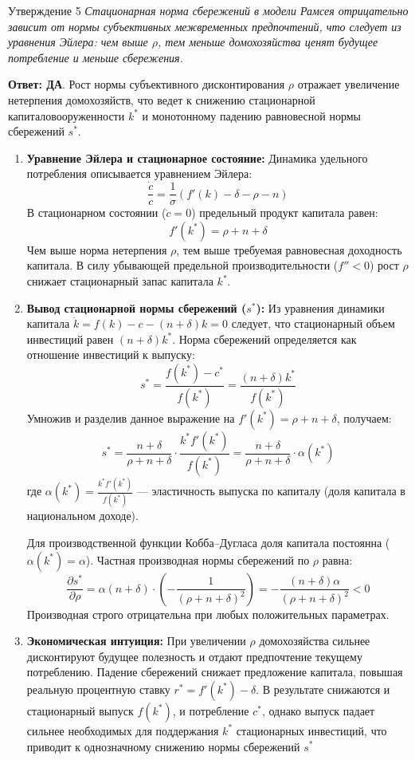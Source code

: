\documentclass[10pt,a4paper]{article}
\newcommand{\qda}{\textbf{\color{yesgreen}Ответ: ДА}}
\newenvironment{answer}[2]{%
  \begin{qbox}{Утверждение #1}
  \textit{#2}\par\smallskip
}{%
  \end{qbox}\vspace{2pt}
}
\begin{document}
\begin{answer}{5}{Стационарная норма сбережений в модели Рамсея отрицательно зависит от нормы субъективных межвременных предпочтений, что следует из уравнения Эйлера: чем выше $\rho$, тем меньше домохозяйства ценят будущее потребление и меньше сбережения.}
\qda. Рост нормы субъективного дисконтирования $\rho$ отражает увеличение нетерпения домохозяйств, что ведет к снижению стационарной капиталовооруженности $k^*$ и монотонному падению равновесной нормы сбережений $s^*$.

\begin{enumerate}
    \item \textbf{Уравнение Эйлера и стационарное состояние:}
    Динамика удельного потребления описывается уравнением Эйлера:
    \[
    \frac{\dot{c}}{c} = \frac{1}{\sigma} \left( f'(k) - \delta - \rho - n \right)
    \]
    В стационарном состоянии ($\dot{c} = 0$) предельный продукт капитала равен:
    \[
    f'(k^*) = \rho + n + \delta
    \]
    Чем выше норма нетерпения $\rho$, тем выше требуемая равновесная доходность капитала. В силу убывающей предельной производительности ($f'' < 0$) рост $\rho$ снижает стационарный запас капитала $k^*$.

    \item \textbf{Вывод стационарной нормы сбережений ($s^*$):}
    Из уравнения динамики капитала $\dot{k} = f(k) - c - (n + \delta)k = 0$ следует, что стационарный объем инвестиций равен $(n + \delta)k^*$. Норма сбережений определяется как отношение инвестиций к выпуску:
    \[
    s^* = \frac{f(k^*) - c^*}{f(k^*)} = \frac{(n + \delta)k^*}{f(k^*)}
    \]
    Умножив и разделив данное выражение на $f'(k^*) = \rho + n + \delta$, получаем:
    \[
    s^* = \frac{n + \delta}{\rho + n + \delta} \cdot \frac{k^* f'(k^*)}{f(k^*)} = \frac{n + \delta}{\rho + n + \delta} \cdot \alpha(k^*)
    \]
    где $\alpha(k^*) = \frac{k^* f'(k^*)}{f(k^*)}$ — эластичность выпуска по капиталу (доля капитала в национальном доходе).

    Для производственной функции Кобба–Дугласа доля капитала постоянна ($\alpha(k^*) = \alpha$). Частная производная нормы сбережений по $\rho$ равна:
    \[
    \frac{\partial s^*}{\partial \rho} = \alpha (n + \delta) \cdot \left( -\frac{1}{(\rho + n + \delta)^2} \right) = -\frac{(n + \delta)\alpha}{(\rho + n + \delta)^2} < 0
    \]
    Производная строго отрицательна при любых положительных параметрах.

    \item \textbf{Экономическая интуиция:}
    При увеличении $\rho$ домохозяйства сильнее дисконтируют будущее полезность и отдают предпочтение текущему потреблению. Падение сбережений снижает предложение капитала, повышая реальную процентную ставку $r^* = f'(k^*) - \delta$. В результате снижаются и стационарный выпуск $f(k^*)$, и потребление $c^*$, однако выпуск падает сильнее необходимых для поддержания $k^*$ стационарных инвестиций, что приводит к однозначному снижению нормы сбережений $s^*$
\end{enumerate}
\end{answer}
\end{document}
